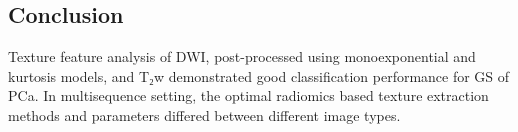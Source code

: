 \documentclass[10pt,letterpaper]{article}
\begin{document}
\subsection*{Conclusion}

Texture feature analysis of DWI, post-processed using monoexponential and
kurtosis models, and T₂w demonstrated good classification performance for GS of
PCa. In multisequence setting, the optimal radiomics based texture extraction
methods and parameters differed between different image types.

\linenumbers

%
%
%
\end{document}

